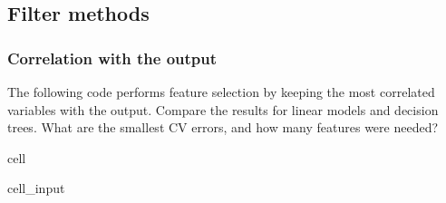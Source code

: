 \documentclass[letterpaper,10pt,english]{jupyterBook}
\begin{document}
\subsection{Filter methods}
\label{\detokenize{05:filter-methods}}

\subsubsection{Correlation with the output}
\label{\detokenize{05:correlation-with-the-output}}
\sphinxAtStartPar
The following code performs feature selection by keeping the most correlated variables with the output. Compare the results for linear models and decision trees. What are the smallest CV errors, and how many features were needed?

\begin{sphinxuseclass}{cell}\begin{sphinxVerbatimInput}

\begin{sphinxuseclass}{cell_input}
\begin{sphinxVerbatim}[commandchars=\\\{\}]
  
  

  

  
    
       \PYG{p}{[}\PYG{p}{]} \PYG{p}{[}\PYG{p}{]}
       \PYG{p}{[}\PYG{p}{]} \PYG{p}{[}\PYG{p}{]}
    

\end{sphinxVerbatim}
\end{sphinxuseclass}
\end{sphinxVerbatimInput}
\end{sphinxuseclass}
\end{document}

